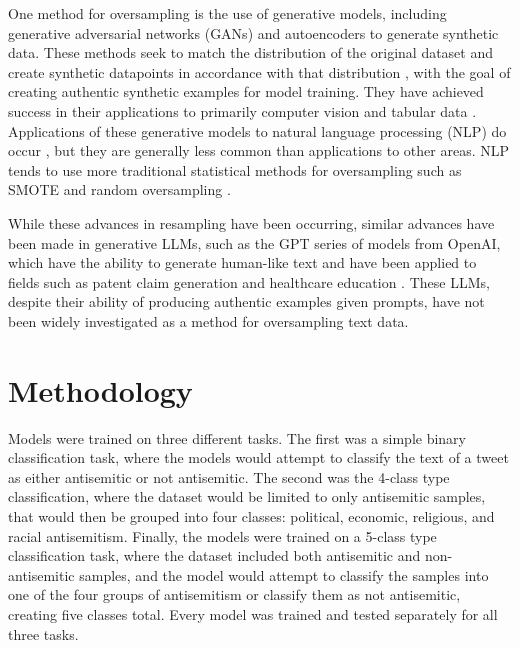 \documentclass[runningheads]{llncs}
\begin{document}
One method for oversampling is the use of generative models, including generative adversarial networks (GANs) and autoencoders to generate synthetic data. These methods seek to match the distribution of the original dataset and create synthetic datapoints in accordance with that distribution \cite{hao}, with the goal of creating authentic synthetic examples for model training. They have achieved success in their applications to primarily computer vision and tabular data \cite{hao} \cite{engelmann} \cite{bellinger} \cite{dai}. Applications of these generative models to natural language processing (NLP) do occur \cite{phung}, but they are generally less common than applications to other areas. NLP tends to use more traditional statistical methods for oversampling such as SMOTE and random oversampling \cite{wijaya} \cite{glazkova}.

While these advances in resampling have been occurring, similar advances have been made in generative LLMs, such as the GPT series of models from OpenAI, which have the ability to generate human-like text \cite{floridi} and have been applied to fields such as patent claim generation \cite{hsiang} and healthcare education \cite{sallam}. These LLMs, despite their ability of producing authentic examples given prompts, have not been widely investigated as a method for oversampling text data.

\section{Methodology}
Models were trained on three different tasks. The first was a simple binary classification task, where the models would attempt to classify the text of a tweet as either antisemitic or not antisemitic. The second was the 4-class type classification, where the dataset would be limited to only antisemitic samples, that would then be grouped into four classes: political, economic, religious, and racial antisemitism. Finally, the models were trained on a 5-class type classification task, where the dataset included both antisemitic and non-antisemitic samples, and the model would attempt to classify the samples into one of the four groups of antisemitism or classify them as not antisemitic, creating five classes total. Every model was trained and tested separately for all three tasks.
\end{document}
